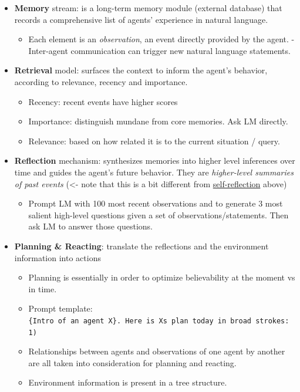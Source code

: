 \begin{itemize}
\tightlist
\item
  \textbf{Memory} stream: is a long-term memory module (external database) that records a comprehensive list of agents' experience in natural language.

  \begin{itemize}
  \tightlist
  \item
    Each element is an \emph{observation}, an event directly provided by the agent. - Inter-agent communication can trigger new natural language statements.
  \end{itemize}
\item
  \textbf{Retrieval} model: surfaces the context to inform the agent's behavior, according to relevance, recency and importance.

  \begin{itemize}
  \tightlist
  \item
    Recency: recent events have higher scores
  \item
    Importance: distinguish mundane from core memories. Ask LM directly.
  \item
    Relevance: based on how related it is to the current situation / query.
  \end{itemize}
\item
  \textbf{Reflection} mechanism: synthesizes memories into higher level inferences over time and guides the agent's future behavior. They are \emph{higher-level summaries of past events} (\textless- note that this is a bit different from \hyperref[self-reflection]{self-reflection} above)

  \begin{itemize}
  \tightlist
  \item
    Prompt LM with 100 most recent observations and to generate 3 most salient high-level questions given a set of observations/statements. Then ask LM to answer those questions.
  \end{itemize}
\item
  \textbf{Planning \& Reacting}: translate the reflections and the environment information into actions

  \begin{itemize}
  \tightlist
  \item
    Planning is essentially in order to optimize believability at the moment vs in time.
  \item
    Prompt template: \texttt{\{Intro\ of\ an\ agent\ X\}.\ Here\ is\ X\textquotesingle{}s\ plan\ today\ in\ broad\ strokes:\ 1)}
  \item
    Relationships between agents and observations of one agent by another are all taken into consideration for planning and reacting.
  \item
    Environment information is present in a tree structure.
  \end{itemize}
\end{itemize}

